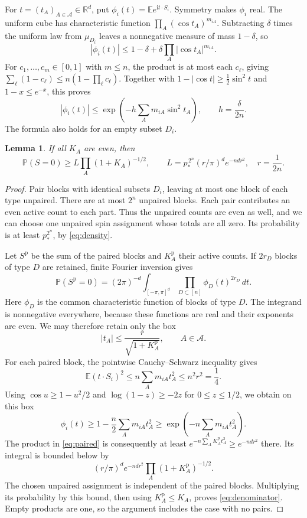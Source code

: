 \documentclass[11pt]{article}
\newtheorem{lemma}[theorem]{Lemma}
\begin{document}
For $t=(t_A)_{A\in\mathcal A}\in\mathbb R^d$, put
$\phi_i(t)=\mathbb E e^{\mathrm i t\cdot S_i}$. Symmetry makes $\phi_i$ real.
The uniform cube has characteristic function
$\prod_A(\cos t_A)^{m_{iA}}$. Subtracting $\delta$ times the uniform law
from $\mu_{D_i}$ leaves a nonnegative measure of mass $1-\delta$, so
\[
 |\phi_i(t)|\leq 1-\delta+
             \delta\prod_A|\cos t_A|^{m_{iA}}.
\]
For $c_1,\ldots,c_m\in[0,1]$ with $m\leq n$, the product is at most each
$c_\ell$, giving
$\sum_\ell(1-c_\ell)\leq n(1-\prod_\ell c_\ell)$.
Together with $1-|\cos t|\geq\frac12\sin^2t$ and $1-x\leq e^{-x}$,
this proves
\begin{equation}\label{eq:damping}
 |\phi_i(t)|\leq
 \exp\left(-h\sum_A m_{iA}\sin^2t_A\right),
 \qquad h=\frac{\delta}{2n}.
\end{equation}
The formula also holds for an empty subset $D_i$.

\begin{lemma}\label{lem:denominator}
If all $K_A$ are even, then
\begin{equation}\label{eq:denominator}
 \mathbb P(S=0)\geq L\prod_A(1+K_A)^{-1/2},
 \qquad
 L=p_*^{\,2^n}(r/\pi)^d e^{-ndr^2},\quad r=\frac1{2n}.
\end{equation}
\end{lemma}
\begin{proof}
Pair blocks with identical subsets $D_i$, leaving at most one block of each type
unpaired. There are at most $2^n$ unpaired blocks. Each pair contributes an
even active count to each part. Thus the unpaired counts are even as well,
and we can choose one unpaired spin assignment whose totals are all zero.
Its probability is at least $p_*^{2^n}$, by \eqref{eq:density}.

Let $S^{\mathrm p}$ be the sum of the paired blocks and $K_A^{\mathrm p}$
their active counts. If $2r_D$ blocks of type $D$ are retained, finite Fourier
inversion gives
\begin{equation}\label{eq:paired}
 \mathbb P(S^{\mathrm p}=0)=
 (2\pi)^{-d}\int_{[-\pi,\pi]^d}
       \prod_{D\subset[n]}\phi_D(t)^{2r_D}\,dt.
\end{equation}
Here $\phi_D$ is the common characteristic function of blocks of type $D$.
The integrand is nonnegative everywhere, because these functions are real
and their exponents are even. We may therefore retain only the box
\[
 |t_A|\leq\frac{r}{\sqrt{1+K_A^{\mathrm p}}},\qquad A\in\mathcal A.
\]
For each paired block, the pointwise Cauchy--Schwarz inequality gives
\[
 \mathbb E(t\cdot S_i)^2
 \leq n\sum_A m_{iA}t_A^2\leq n^2r^2=\frac14.
\]
Using $\cos u\geq1-u^2/2$ and
$\log(1-z)\geq-2z$ for $0\leq z\leq1/2$, we obtain on this box
\[
 \phi_i(t)\geq
 1-\frac n2\sum_A m_{iA}t_A^2
 \geq\exp\left(-n\sum_A m_{iA}t_A^2\right).
\]
The product in \eqref{eq:paired} is consequently at least
$e^{-n\sum_A K_A^{\mathrm p}t_A^2}\geq e^{-ndr^2}$ there. Its integral
is bounded below by
\[
 (r/\pi)^d e^{-ndr^2}\prod_A(1+K_A^{\mathrm p})^{-1/2}.
\]
The chosen unpaired assignment is independent of the paired blocks.
Multiplying its probability by this bound, then using
$K_A^{\mathrm p}\leq K_A$, proves \eqref{eq:denominator}.
Empty products are one, so the argument includes the case with no pairs.
\end{proof}
\end{document}

